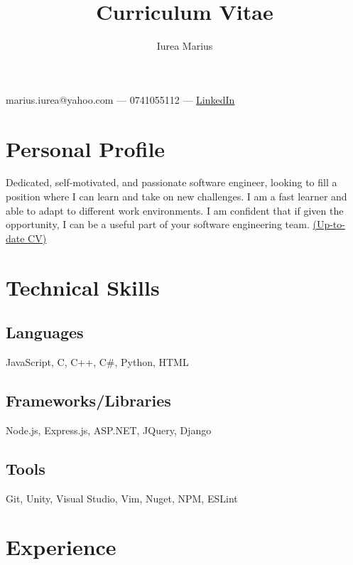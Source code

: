 \documentclass[a4paper,hidelinks,11pt]{article}
\begin{document}
\title{Curriculum Vitae}
\author{Iurea Marius}
\renewcommand{\maketitle}
{
        \begin{center}
        {\huge\bfseries
        \thetitle

        \theauthor}

        marius.iurea@yahoo.com --- 0741055112 --- \href{https://www.linkedin.com/in/marius-iurea-49b7021b5/}{LinkedIn}

        \end{center}
}

\maketitle

\section{Personal Profile}
Dedicated, self-motivated, and passionate software engineer, looking to fill a position where I can learn and take on new
challenges. I am a fast learner and able to adapt to different work environments. I am confident that if given the opportunity, I can be a useful part of your software engineering team. \href{https://github.com/IureaMarius/CV}{(Up-to-date CV)}



\section{Technical Skills}
\subsection{Languages}
JavaScript, C, C++, C\#, Python, HTML
\subsection{Frameworks/Libraries}
Node.js, Express.js, ASP.NET, JQuery, Django
\subsection{Tools}
Git, Unity, Visual Studio, Vim, Nuget, NPM, ESLint

\section{Experience}
\end{document}
